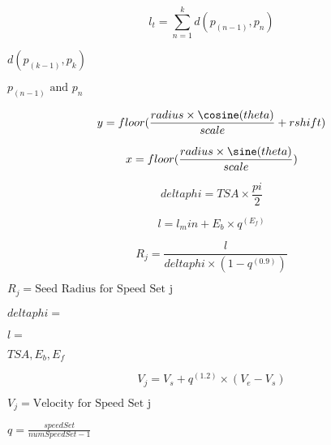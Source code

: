 \documentclass{article}
\begin{document}
\[ l_t = \sum\limits_{n=1}^k d(p_(n-1), p_n) \]
\pagebreak

$ d(p_(k-1), p_k) $
\pagebreak

$ p_(n-1) \text{ and } p_n $
\pagebreak

\[ y = floor(\frac{radius \times \cosine(theta)}{scale}+rshift) \]
\pagebreak

\[ x = floor(\frac{radius \times \sine(theta)}{scale}) \]
\pagebreak

\[ delta phi = TSA \times \frac{pi}{2} \]
\pagebreak

\[ l = l_min + E_b \times q^(E_f) \]
\pagebreak

\[ R_j = \frac{l}{delta phi \times (1-q^(0.9))} \]
\pagebreak

$ R_j = \text{Seed Radius for Speed Set j} $
\pagebreak

$ delta phi =$
\pagebreak

$ l=$
\pagebreak

$ TSA, E_b, E_f$
\pagebreak

\[ V_j = V_s+q^(1.2) \times (V_e-V_s) \]
\pagebreak

$ V_j = \text{Velocity for Speed Set j} $
\pagebreak

$ q= \frac{speedSet}{numSpeedSet-1} $
\pagebreak
\end{document}
